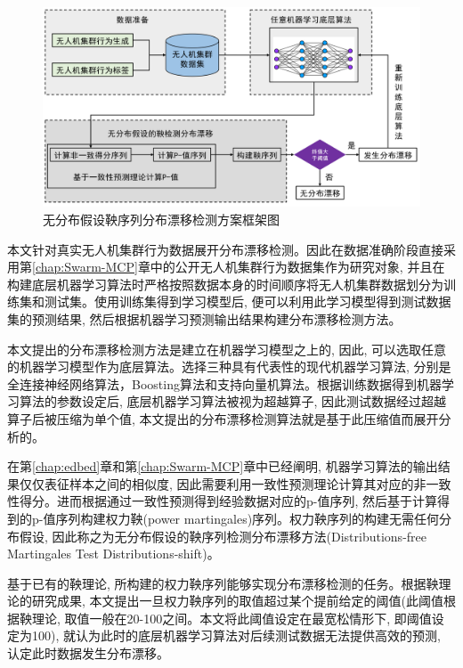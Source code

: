 \begin{figure}[htbp] %
\centerline{\includegraphics[width=1\linewidth]{Img/martingale.png}}
\caption{无分布假设鞅序列分布漂移检测方案框架图}
\label{fig:martingale}
\end{figure}

本文针对真实无人机集群行为数据展开分布漂移检测。因此在数据准确阶段直接采用第\ref{chap:Swarm-MCP}章中的公开无人机集群行为数据集作为研究对象, 并且在构建底层机器学习算法时严格按照数据本身的时间顺序将无人机集群数据划分为训练集和测试集。使用训练集得到学习模型后, 便可以利用此学习模型得到测试数据集的预测结果, 然后根据机器学习预测输出结果构建分布漂移检测方法。

本文提出的分布漂移检测方法是建立在机器学习模型之上的, 因此, 可以选取任意的机器学习模型作为底层算法。选择三种具有代表性的现代机器学习算法, 分别是全连接神经网络算法，Boosting算法和支持向量机算法。根据训练数据得到机器学习算法的参数设定后, 底层机器学习算法被视为超越算子, 因此测试数据经过超越算子后被压缩为单个值, 本文提出的分布漂移检测算法就是基于此压缩值而展开分析的。

在第\ref{chap:edbed}章和第\ref{chap:Swarm-MCP}章中已经阐明, 机器学习算法的输出结果仅仅表征样本之间的相似度\citep{vapniktalk2022}, 因此需要利用一致性预测理论计算其对应的非一致性得分。进而根据通过一致性预测得到经验数据对应的p-值序列\citep{2006Hedging}, 然后基于计算得到的p-值序列构建权力鞅(power martingales)序列\citep{Ville1939}。权力鞅序列的构建无需任何分布假设, 因此称之为无分布假设的鞅序列检测分布漂移方法(Distributions-free Martingales Test Distributions-shift)。 

基于已有的鞅理论\citep{glenn-vovk2001,glenn-vovk2019}, 所构建的权力鞅序列能够实现分布漂移检测的任务。根据鞅理论的研究成果, 本文提出一旦权力鞅序列的取值超过某个提前给定的阈值(此阈值根据鞅理论, 取值一般在20-100之间。本文将此阈值设定在最宽松情形下, 即阈值设定为100), 就认为此时的底层机器学习算法对后续测试数据无法提供高效的预测, 认定此时数据发生分布漂移。


